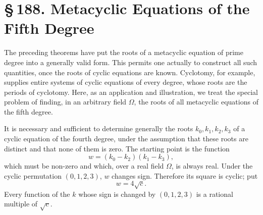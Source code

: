 \documentclass[11pt]{article}
\providecommand{\sect}[2]{\section*{\S\,#1. #2}}
\begin{document}
\sect{188}{Metacyclic Equations of the Fifth Degree}

The preceding theorems have put the roots of a metacyclic equation of prime degree into a generally valid form. This permits one actually to construct all such quantities, once the roots of cyclic equations are known. Cyclotomy, for example, supplies entire systems of cyclic equations of every degree, whose roots are the periods of cyclotomy. Here, as an application and illustration, we treat the special problem of finding, in an arbitrary field $\Omega$, the roots of all metacyclic equations of the fifth degree.

It is necessary and sufficient to determine generally the roots $k_0,k_1,k_2,k_3$ of a cyclic equation of the fourth degree, under the assumption that these roots are distinct and that none of them is zero. The starting point is the function
\begin{equation}\tag{1}
  w=(k_0-k_2)(k_1-k_3),
\end{equation}
which must be non-zero and which, over a real field $\Omega$, is always real. Under the cyclic permutation $(0,1,2,3)$, $w$ changes sign. Therefore its square is cyclic; put
\begin{equation}\tag{2}
  w=4\sqrt{c}.
\end{equation}
Every function of the $k$ whose sign is changed by $(0,1,2,3)$ is a rational multiple of $\sqrt c$.
\end{document}
